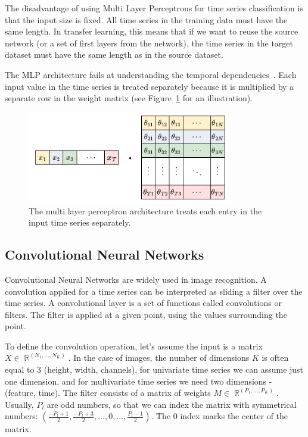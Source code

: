 \documentclass[a4paper,11pt,twoside]{report}
\theoremstyle{definition}
\DeclareMathOperator{\real}{\mathbb{R}}
\begin{document}
The disadvantage of using Multi Layer Perceptrons for time series classification is that the input size is fixed. All time series in the training data must have the same length. In transfer learning, this means that if we want to reuse the source network (or a set of first layers from the network), the time series in the target dataset must have the same length as in the source dataset.

The MLP architecture fails at understanding the temporal dependencies~\cite{dl_tsc}. Each input value in the time series is treated separately because it is multiplied by a separate row in the weight matrix (see Figure~\ref{fig:mlp_multiplication} for an illustration).
\begin{figure}
\centering
\label{fig:mlp_multiplication}
\includegraphics[height=4cm]{imgs/MLP_multiplication_v2.png}
\caption{The multi layer perceptron architecture treats each entry in the input time series separately.}
\end{figure}
\subsection{Convolutional Neural Networks}
Convolutional Neural Networks are widely used in image recognition. A convolution applied for a time series can be interpreted as sliding a filter over the time series. A convolutional layer is a set of functions called convolutions or filters. The filter is applied at a given point, using the values surrounding the point.

To define the convolution operation, let's assume the input is a matrix $X \in \real^{(N_1, \dots, N_K)}$. In the case of images, the number of dimensions $K$ is often equal to $3$ (height, width, channels), for univariate time series we can assume just one dimension, and for multivariate time series we need two dimensions - (feature, time).
The filter consists of a matrix of weights $M \in \real^{(P_1, \dots, P_K)}$.
Usually, $P_l$ are odd numbers, so that we can index the matrix with symmetrical numbers: $ (\frac{-P_l+1}{2},  \frac{-P_l+3}{2}, \dots, 0, \dots, \frac{P_l-1}{2})$. The $0$ index marks the center of the matrix.
\end{document}

